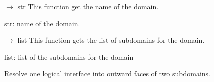 \documentclass[letterpaper,10pt,english]{sphinxmanual}
\begin{document}
\begin{fulllineitems}
\begin{fulllineitems}
\end{fulllineitems}


\begin{fulllineitems}
\label{\detokenize{scrimp:scrimp.domain.Domain.get_name}}
\pysigstartsignatures
\pysiglinewithargsret
{}
{}
{{ $\rightarrow$ str}}
\pysigstopsignatures
\sphinxAtStartPar
This function get the name of the domain.
\begin{description}
\sphinxAtStartPar
str: name of the domain.

\end{description}

\end{fulllineitems}


\begin{fulllineitems}
\label{\detokenize{scrimp:scrimp.domain.Domain.get_subdomains}}
\pysigstartsignatures
\pysiglinewithargsret
{}
{}
{{ $\rightarrow$ list}}
\pysigstopsignatures
\sphinxAtStartPar
This function gets the list of subdomains for the domain.
\begin{description}
\sphinxAtStartPar
list: list of the subdomains for the domain

\end{description}

\end{fulllineitems}


\begin{fulllineitems}
\label{\detokenize{scrimp:scrimp.domain.Domain.resolve_interface}}
\pysigstartsignatures
\pysiglinewithargsret
{}
{\sphinxparamcomma {}\sphinxparamcomma {}}
{}
\pysigstopsignatures
\sphinxAtStartPar
Resolve one logical interface into outward faces of two subdomains.


\end{fulllineitems}
\end{fulllineitems}
\end{document}
